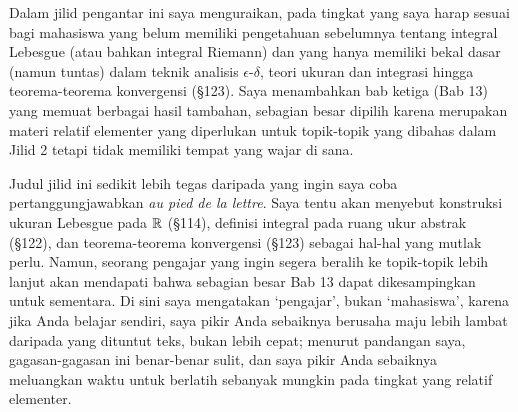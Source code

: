 
\def\volumename{Minimum yang tak tereduksi}



Dalam jilid pengantar ini saya menguraikan, pada tingkat yang saya harap
sesuai bagi mahasiswa yang belum memiliki pengetahuan sebelumnya tentang
integral Lebesgue (atau bahkan integral Riemann) dan yang hanya memiliki
bekal dasar (namun tuntas) dalam teknik analisis
$\epsilon$-$\delta$, teori ukuran dan integrasi hingga
teorema-teorema konvergensi (\S123). Saya menambahkan bab ketiga (Bab
13) yang memuat berbagai hasil tambahan, sebagian besar dipilih karena
merupakan materi relatif elementer yang diperlukan untuk topik-topik yang
dibahas dalam Jilid 2 tetapi tidak memiliki tempat yang wajar di sana.

Judul jilid ini sedikit lebih tegas daripada yang ingin saya coba
pertanggungjawabkan {\it au pied de la lettre}. Saya tentu akan
menyebut konstruksi ukuran Lebesgue pada $\Bbb R$ (\S114),
definisi integral pada ruang ukur abstrak (\S122), dan
teorema-teorema konvergensi (\S123) sebagai hal-hal yang mutlak perlu.
Namun, seorang pengajar yang ingin segera beralih ke topik-topik lebih
lanjut akan mendapati bahwa sebagian besar Bab 13 dapat dikesampingkan
untuk sementara. Di sini saya mengatakan `pengajar', bukan
`mahasiswa', karena jika Anda belajar sendiri, saya pikir Anda
sebaiknya berusaha maju lebih lambat daripada yang dituntut teks, bukan
lebih cepat; menurut pandangan saya, gagasan-gagasan ini benar-benar
sulit, dan saya pikir Anda sebaiknya meluangkan waktu untuk berlatih
sebanyak mungkin pada tingkat yang relatif elementer.

